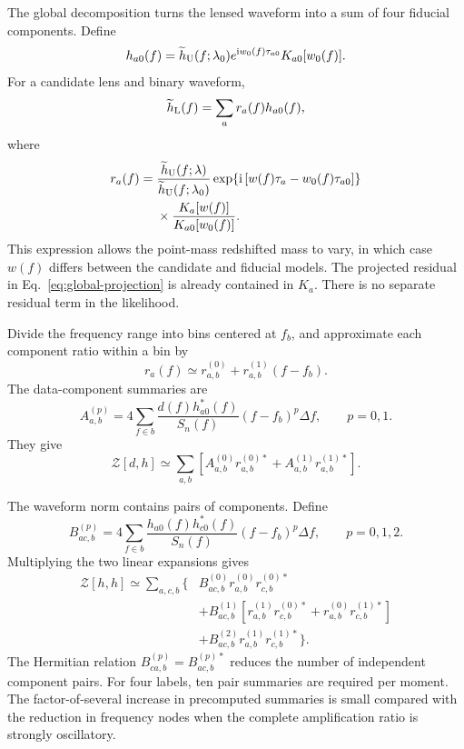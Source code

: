 \documentclass[aps,prd,twocolumn,nofootinbib,superscriptaddress,floatfix]{revtex4-2}
\newcommand{\ii}{\mathrm{i}}
\newcommand{\cZ}{\mathcal{Z}}
\begin{document}
The global decomposition turns the lensed waveform into a sum of four
fiducial components.  Define
\begin{equation}
 h_{a0}(f)=\widetilde h_{\rm U}(f;\lambda_0)
 e^{\ii w_0(f)\tau_{a0}}
 K_{a0}[w_0(f)].
 \label{eq:fiducial-component}
\end{equation}
For a candidate lens and binary waveform,
\begin{equation}
 \widetilde h_{\rm L}(f)=\sum_a r_a(f)h_{a0}(f),
 \label{eq:rb-component-sum}
\end{equation}
where
\begin{align}
 r_a(f)={}&
 \frac{\widetilde h_{\rm U}(f;\lambda)}
      {\widetilde h_{\rm U}(f;\lambda_0)}
 \exp\!\left\{\ii\left[w(f)\tau_a-w_0(f)\tau_{a0}\right]\right\}
 \nonumber\\
 &\times\frac{K_a[w(f)]}{K_{a0}[w_0(f)]}.
 \label{eq:component-ratio}
\end{align}
This expression allows the point-mass redshifted mass to vary, in which case
$w(f)$ differs between the candidate and fiducial models.  The projected
residual in Eq.~\eqref{eq:global-projection} is already contained in $K_a$.
There is no separate residual term in the likelihood.

Divide the frequency range into bins centered at $f_b$, and approximate each
component ratio within a bin by
\begin{equation}
 r_a(f)\simeq r_{a,b}^{(0)}+r_{a,b}^{(1)}(f-f_b).
 \label{eq:linear-ratio}
\end{equation}
The data-component summaries are
\begin{equation}
 A_{a,b}^{(p)}=
 4\sum_{f\in b}\frac{d(f)h_{a0}^*(f)}{S_n(f)}(f-f_b)^p\Delta f,
 \qquad p=0,1.
 \label{eq:A-summary}
\end{equation}
They give
\begin{equation}
 \cZ[d,h]\simeq
 \sum_{a,b}\left[A_{a,b}^{(0)}r_{a,b}^{(0)*}
                  +A_{a,b}^{(1)}r_{a,b}^{(1)*}\right].
 \label{eq:data-term-rb}
\end{equation}

The waveform norm contains pairs of components.  Define
\begin{equation}
 B_{ac,b}^{(p)}=
 4\sum_{f\in b}\frac{h_{a0}(f)h_{c0}^*(f)}{S_n(f)}
 (f-f_b)^p\Delta f,
 \qquad p=0,1,2.
 \label{eq:B-summary}
\end{equation}
Multiplying the two linear expansions gives
\begin{align}
 \cZ[h,h]\simeq\sum_{a,c,b}\bigg\{&
 B_{ac,b}^{(0)}r_{a,b}^{(0)}r_{c,b}^{(0)*}\nonumber\\
 &+B_{ac,b}^{(1)}\left[
 r_{a,b}^{(1)}r_{c,b}^{(0)*}
 +r_{a,b}^{(0)}r_{c,b}^{(1)*}\right]\nonumber\\
 &+B_{ac,b}^{(2)}r_{a,b}^{(1)}r_{c,b}^{(1)*}\bigg\}.
 \label{eq:norm-term-rb}
\end{align}
The Hermitian relation $B_{ca,b}^{(p)}=B_{ac,b}^{(p)*}$ reduces the number of
independent component pairs.  For four labels, ten pair summaries are required
per moment.  The factor-of-several increase in precomputed summaries is small
compared with the reduction in frequency nodes when the complete amplification
ratio is strongly oscillatory.
\end{document}
